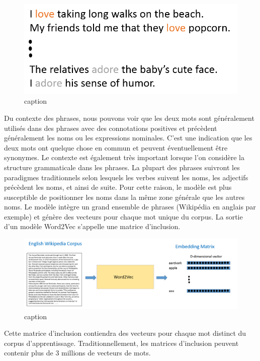 \documentclass[11pt]{article}
\makeatletter
\def\maxwidth{\ifdim\Gin@nat@width>\linewidth\linewidth
    \else\Gin@nat@width\fi}
\let\Oldincludegraphics\includegraphics
\renewcommand{\includegraphics}[1]{\Oldincludegraphics[width=.8\maxwidth]{#1}}
\makeatother
\begin{document}
\begin{figure}
\centering
\includegraphics{Images/SentimentAnalysis9.png}
\caption{caption}
\end{figure}

Du contexte des phrases, nous pouvons voir que les deux mots sont
généralement utilisés dans des phrases avec des connotations positives
et précèdent généralement les noms ou les expressions nominales. C'est
une indication que les deux mots ont quelque chose en commun et peuvent
éventuellement être synonymes. Le contexte est également très important
lorsque l'on considère la structure grammaticale dans les phrases. La
plupart des phrases suivront les paradigmes traditionnels selon lesquels
les verbes suivent les noms, les adjectifs précèdent les noms, et ainsi
de suite. Pour cette raison, le modèle est plus susceptible de
positionner les noms dans la même zone générale que les autres noms. Le
modèle intègre un grand ensemble de phrases (Wikipédia en anglais par
exemple) et génère des vecteurs pour chaque mot unique du corpus. La
sortie d'un modèle Word2Vec s'appelle une matrice d'inclusion.

\begin{figure}
\centering
\includegraphics{Images/SentimentAnalysis3.png}
\caption{caption}
\end{figure}

Cette matrice d'inclusion contiendra des vecteurs pour chaque mot
distinct du corpus d'apprentissage. Traditionnellement, les matrices
d'inclusion peuvent contenir plus de 3 millions de vecteurs de mots.
\end{document}

